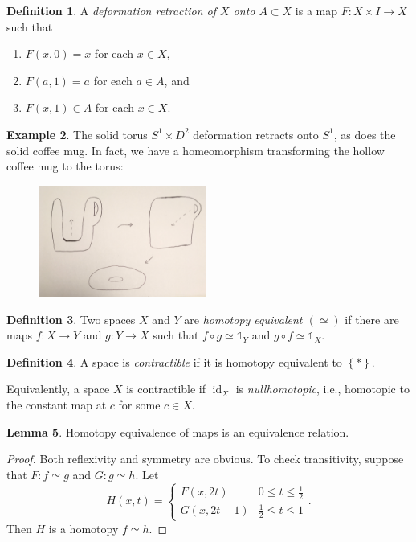 \documentclass[10pt,letterpaper,cm]{nupset}
\theoremstyle{definition}
\newtheorem{definition}{Definition}[subsection]
\newtheorem{exmp}[definition]{Example}
\theoremstyle{theorem}
\newtheorem{lemma}[definition]{Lemma}
\theoremstyle{remark}
\newcommand{\1}{\mathbb{1}}
\newcommand{\0}{\vec 0}
\DeclareMathOperator{\id}{id}
\begin{document}
\begin{definition}
A \textit{deformation retraction of $X$ onto $A\subset X$} is a map $F: X \times I \to X$ such that 
\begin{enumerate}[label=(\roman*)]
\item $F(x, 0) = x$ for each $x\in X$, 
\item $F(a, 1) = a$ for each $a\in A$, and 
\item $F(x, 1) \in A$ for each $x\in X$.
\end{enumerate}
\end{definition}

\begin{exmp}
The solid torus $S^1 \times D^2$ deformation retracts onto $S^1$, as does the solid coffee mug. In fact, we have a homeomorphism transforming the hollow coffee mug to the torus:

\begin{figure}[H]
\centering
\includegraphics[width=55mm]{mug.jpg}
\end{figure}
\end{exmp}

\begin{definition}
Two spaces $X$ and $Y$ are \textit{homotopy equivalent $(\simeq)$} if there are maps $f: X\to Y$ and $g: Y \to X$ such that $f\circ g \simeq \mathbb{1}_Y$ and $g\circ f \simeq \mathbb{1}_X$.
\end{definition}

\begin{definition}
A space is \textit{contractible} if it is homotopy equivalent to $\left\{\ast \right\}$.
\end{definition}

Equivalently, a space $X$ is contractible if $\id_X$ is \textit{nullhomotopic}, i.e., homotopic to the constant map at $c$ for some $c\in X$.

\begin{lemma}
Homotopy equivalence of maps is an equivalence relation.
\end{lemma}
\begin{proof}
Both reflexivity and symmetry are obvious. To check transitivity, suppose that $F : f \simeq g$ and $G: g\simeq h$. Let $$H(x,t) = \begin{cases}
F(x, 2t) & 0 \leq t \leq \frac{1}{2}
\\ G(x, 2t-1) & \frac{1}{2} \leq t \leq 1
\end{cases}.$$ Then $H$ is a homotopy $f \simeq h$.
\end{proof}
\end{document}

